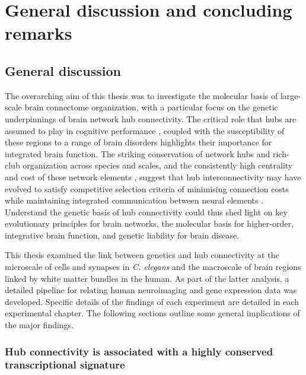 \chapter{General discussion and concluding remarks}
\label{ch:Discussion}

\section{General discussion}
The overarching aim of this thesis was to investigate the molecular basis of large-scale brain connectome organization, with a particular focus on the genetic underpinnings of brain network hub connectivity. The critical role that hubs are assumed to play in cognitive performance \citep{Buckner2009,Mesulam1998}, coupled with the susceptibility of these regions to a range of brain disorders \citep{Bassett2009a,Crossley2014,Fornito2015} highlights their importance for integrated brain function. The striking conservation of network hubs and rich-club organization across species and scales, and the consistently high centrality and cost of these network elements \citep{VandenHeuvel2016}, suggest that hub interconnectivity may have evolved to satisfy competitive selection criteria of minimising connection costs while maintaining integrated communication between neural elements \citep{Bullmore2012}. Understand the genetic basis of hub connectivity could thus shed light on key evolutionary principles for brain networks, the molecular basis for higher-order, integrative brain function, and genetic liability for brain disease. 

This thesis examined the link between genetics and hub connectivity at the microscale of cells and synapses in \textit{C. elegans} and the macroscale of brain regions linked by white matter bundles in the human. As part of the latter analysis, a detailed pipeline for relating human neuroimaging and gene expression data was developed. Specific details of the findings of each experiment are detailed in each experimental chapter. The following sections outline some general implications of the major findings. 

\subsection*{Hub connectivity is associated with a highly conserved transcriptional signature}


